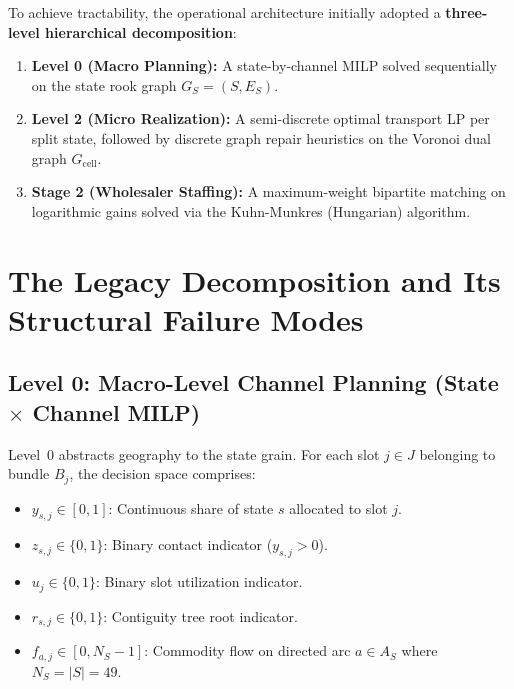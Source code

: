 \documentclass[11pt,a4paper]{article}
\theoremstyle{plain}
\theoremstyle{definition}
\begin{document}
To achieve tractability, the operational architecture initially adopted a \textbf{three-level hierarchical decomposition}:
\begin{enumerate}[leftmargin=1.8em]
    \item \textbf{Level 0 (Macro Planning):} A state-by-channel MILP solved sequentially on the state rook graph $G_S = (S, E_S)$.
    \item \textbf{Level 2 (Micro Realization):} A semi-discrete optimal transport LP per split state, followed by discrete graph repair heuristics on the Voronoi dual graph $G_{\text{cell}}$.
    \item \textbf{Stage 2 (Wholesaler Staffing):} A maximum-weight bipartite matching on logarithmic gains solved via the Kuhn-Munkres (Hungarian) algorithm.
\end{enumerate}

\section{The Legacy Decomposition and Its Structural Failure Modes}

\subsection{Level 0: Macro-Level Channel Planning (State \texorpdfstring{$\times$}{x} Channel MILP)}
Level~0 abstracts geography to the state grain. For each slot $j \in J$ belonging to bundle $B_j$, the decision space comprises:
\begin{itemize}[leftmargin=1.5em]
    \item $y_{s,j} \in [0, 1]$: Continuous share of state $s$ allocated to slot $j$.
    \item $z_{s,j} \in \{0, 1\}$: Binary contact indicator ($y_{s,j} > 0$).
    \item $u_j \in \{0, 1\}$: Binary slot utilization indicator.
    \item $r_{s,j} \in \{0, 1\}$: Contiguity tree root indicator.
    \item $f_{a,j} \in [0, N_S-1]$: Commodity flow on directed arc $a \in A_S$ where $N_S = |S| = 49$.
\end{itemize}
\end{document}
